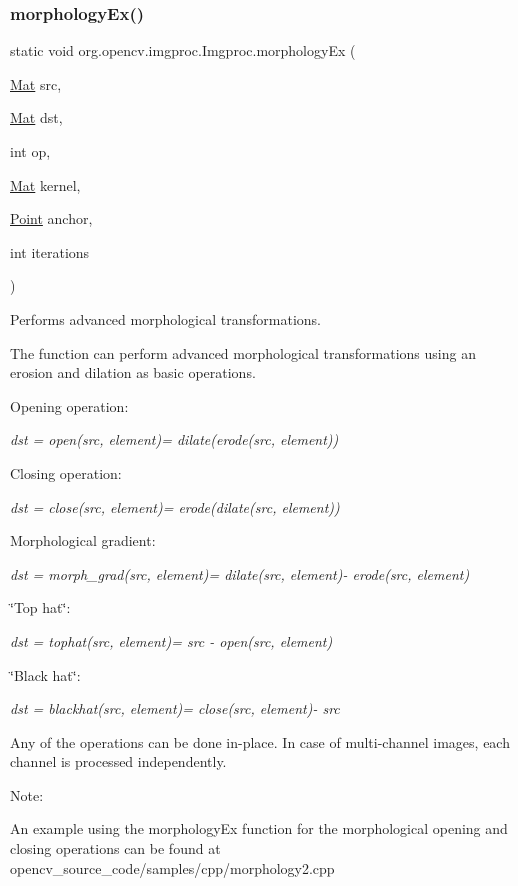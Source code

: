 \subsubsection{\texorpdfstring{morphology\+Ex()}{morphologyEx()}\hspace{0.1cm}{\footnotesize\ttfamily [2/3]}}
{\footnotesize\ttfamily static void org.\+opencv.\+imgproc.\+Imgproc.\+morphology\+Ex (\begin{DoxyParamCaption}\item[{\mbox{\hyperlink{classorg_1_1opencv_1_1core_1_1_mat}{Mat}}}]{src,  }\item[{\mbox{\hyperlink{classorg_1_1opencv_1_1core_1_1_mat}{Mat}}}]{dst,  }\item[{int}]{op,  }\item[{\mbox{\hyperlink{classorg_1_1opencv_1_1core_1_1_mat}{Mat}}}]{kernel,  }\item[{\mbox{\hyperlink{classorg_1_1opencv_1_1core_1_1_point}{Point}}}]{anchor,  }\item[{int}]{iterations }\end{DoxyParamCaption})\hspace{0.3cm}{\ttfamily [static]}}

Performs advanced morphological transformations.

The function can perform advanced morphological transformations using an erosion and dilation as basic operations.

Opening operation\+:

{\itshape dst = open(src, element)= dilate(erode(src, element))}

Closing operation\+:

{\itshape dst = close(src, element)= erode(dilate(src, element))}

Morphological gradient\+:

{\itshape dst = morph\+\_\+grad(src, element)= dilate(src, element)-\/ erode(src, element)}

\char`\"{}\+Top hat\char`\"{}\+:

{\itshape dst = tophat(src, element)= src -\/ open(src, element)}

\char`\"{}\+Black hat\char`\"{}\+:

{\itshape dst = blackhat(src, element)= close(src, element)-\/ src}

Any of the operations can be done in-\/place. In case of multi-\/channel images, each channel is processed independently.

Note\+:


\begin{DoxyItemize}
\item An example using the morphology\+Ex function for the morphological opening and closing operations can be found at opencv\+\_\+source\+\_\+code/samples/cpp/morphology2.\+cpp 
\end{DoxyItemize}


